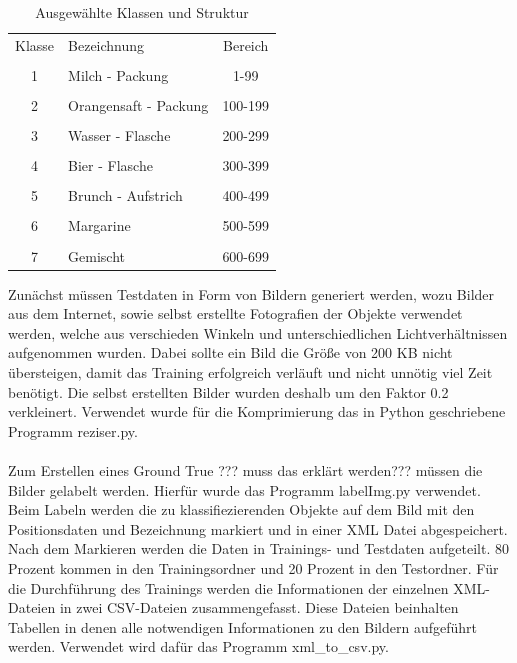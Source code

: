 \documentclass[a4paper,12pt,oneside]{article}
\begin{document}
\begin{table}
[h]
\centering
\caption{Ausgewählte Klassen und Struktur}
\label{klassen2}
\begin{tabular}{|c|l|c|}
  
    Klasse   &   Bezeichnung   &   Bereich   \\
  & & \\
    1   &   Milch - Packung   &   1-99   \\
  & & \\
    2   &   Orangensaft - Packung   &   100-199   \\
  & & \\
    3   &   Wasser - Flasche   &   200-299   \\
  & & \\
    4   &   Bier - Flasche   &   300-399   \\
  & & \\
    5   &   Brunch - Aufstrich   &   400-499   \\
  & & \\
    6   &   Margarine   &   500-599   \\
  & & \\
    7   &   Gemischt   &   600-699
  
\end{tabular}
\end{table}

\vspace{1 cm}

Zunächst müssen Testdaten in Form von Bildern generiert werden, wozu Bilder aus dem Internet, sowie selbst erstellte Fotografien der Objekte verwendet werden, welche aus verschieden Winkeln und unterschiedlichen Lichtverhältnissen aufgenommen wurden. Dabei sollte ein Bild die Größe von 200 KB nicht übersteigen, damit das Training erfolgreich verläuft und nicht unnötig viel Zeit benötigt. Die selbst erstellten Bilder wurden deshalb um den Faktor 0.2 verkleinert. Verwendet wurde für die Komprimierung das in Python geschriebene Programm reziser.py.\\
\\
Zum Erstellen eines Ground True ??? muss das erklärt werden??? müssen die Bilder gelabelt werden. Hierfür wurde das Programm labelImg.py verwendet. Beim Labeln werden die zu klassifiezierenden Objekte auf dem Bild mit den Positionsdaten und Bezeichnung markiert und in einer XML Datei abgespeichert. Nach dem Markieren werden die Daten in Trainings- und Testdaten aufgeteilt. 80 Prozent kommen in den Trainingsordner und 20 Prozent in den Testordner. Für die Durchführung des Trainings werden die Informationen der einzelnen XML-Dateien in zwei CSV-Dateien zusammengefasst. Diese Dateien beinhalten Tabellen in denen alle notwendigen Informationen zu den Bildern aufgeführt werden. Verwendet wird dafür das Programm xml\_to\_csv.py.\\
\\
\end{document}
